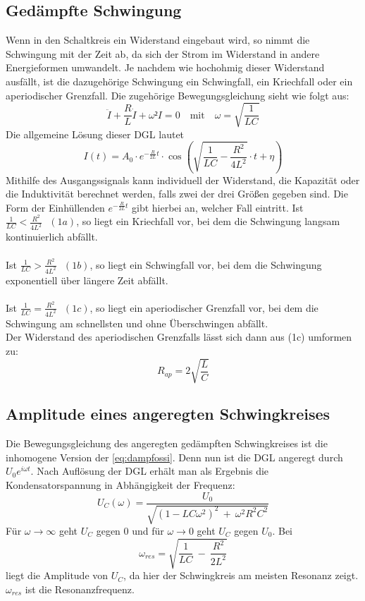 \subsection{Gedämpfte Schwingung}
Wenn in den Schaltkreis ein Widerstand eingebaut wird, so nimmt die Schwingung mit der Zeit ab, da sich der Strom im Widerstand in andere Energieformen umwandelt.
Je nachdem wie hochohmig dieser Widerstand ausfällt, ist die dazugehörige Schwingung ein Schwingfall, ein Kriechfall oder ein aperiodischer Grenzfall.
Die zugehörige Bewegungsgleichung sieht wie folgt aus:
\begin{equation}
    \ddot{I} + \frac{R}{L}\dot{I} + \omega² I = 0 \quad\textrm{mit}\quad \omega = \sqrt{\frac{1}{LC}}
    \label{eq:dampfossi}
\end{equation}
Die allgemeine Lösung dieser DGL lautet
\begin{equation}
    I(t) = A_0 \cdot e^{-\frac{R}{2L}t} \cdot \cos{(\sqrt{\frac{1}{LC}-\frac{R^2}{4L^2}}\cdot t+\eta)}
\end{equation}
Mithilfe des Ausgangssignals kann individuell der Widerstand, die Kapazität oder die Induktivität berechnet werden, falls zwei der drei Größen gegeben sind.
Die Form der Einhüllenden \(e^{-\frac{R}{2L}t}\) gibt hierbei an, welcher Fall eintritt.
Ist \(\frac{1}{LC}<\frac{R^2}{4L^2}\ \ \ (1a)\), so liegt ein Kriechfall vor, bei dem die Schwingung langsam kontinuierlich abfällt.
\\\\
Ist \(\frac{1}{LC}>\frac{R^2}{4L^2}\ \ \ (1b)\), so liegt ein Schwingfall vor, bei dem die Schwingung exponentiell über längere Zeit abfällt.
\\\\
Ist \(\frac{1}{LC}=\frac{R^2}{4L^2}\ \ \ (1c)\), so liegt ein aperiodischer Grenzfall vor, bei dem die Schwingung am schnellsten und ohne Überschwingen abfällt.
\\
Der Widerstand des aperiodischen Grenzfalls lässt sich dann aus (1c) umformen zu:
\begin{equation}
    R_{ap} = 2\sqrt{\frac{L}{C}}
    \label{eq:rap}
\end{equation}
\subsection{Amplitude eines angeregten Schwingkreises}
Die Bewegungsgleichung des angeregten gedämpften Schwingkreises ist die inhomogene Version der \autoref{eq:dampfossi}.
Denn nun ist die DGL angeregt durch $U_0e^{i\omega t}$.
Nach Auflösung der DGL erhält man als Ergebnis die Kondensatorspannung in Abhängigkeit der Frequenz:
\begin{equation}
    U_C(\omega) = \frac{U_0}{\sqrt{(1-LC\omega^2)^2\ +\ \omega^2R^2C^2}}
    \label{eq:konspan}
\end{equation}
Für $\omega \rightarrow \infty$ geht $U_C$ gegen 0 und für $\omega \rightarrow 0$ geht $U_C$ gegen $U_0$.
Bei
\begin{equation}
    \omega_{res} = \sqrt{\frac{1}{LC}\ -\ \frac{R^2}{2L^2}}
    \label{eq:resfreq}
\end{equation}
liegt die Amplitude von $U_C$, da hier der Schwingkreis am meisten Resonanz zeigt. $\omega_{res}$ ist die Resonanzfrequenz.
